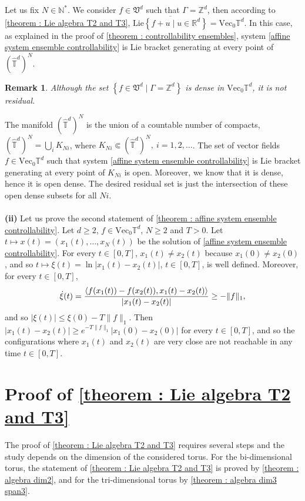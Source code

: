 \documentclass[10pt]{article}
\newcommand{\R}{{\mathbb R}}
\newcommand{\T}{{\mathbb T}}
\newcommand{\N}{{\mathbb N}}
\newcommand{\Z}{{\mathbb Z}}
\newcommand{\ov}{\overline}
\newcommand{\la}{\langle}
\newcommand{\ra}{\rangle}
\newtheorem{rem}{Remark}
\begin{document}
Let us fix $N \in \N^*$. We consider $f\in \mathfrak{V}^d$ such that $\Gamma =\Z^d$, then according to \cref{theorem : Lie algebra T2 and T3}, $\ov{\mathrm{Lie}\left\{f+u \mid u \in \R^d\right\}}=\mathrm{Vec}_0\T^d$. In this case, as explained in the proof of \cref{theorem : controllability ensembles}, system \eqref{affine system ensemble controllability} is Lie bracket generating at every point of $(\hat\T^d)^N$. 
\begin{rem}
    Although the set $\left\{f \in \mathfrak{V}^d \mid \Gamma = \Z^d\right\}$ is dense in $\mathrm{Vec}_0\T^d$, it is not residual.
\end{rem}
The manifold $(\hat\T^d)^N$ is the union of a countable number of compacts, $(\hat\T^d)^N=\bigcup\limits_iK_{Ni}$, where 
$K_{Ni}\Subset(\hat\T^d)^N,\ i=1,2,\dots$. The set of vector fields $f\in\mathrm{Vec}_0\T^d$ such that system \eqref{affine system ensemble controllability} is Lie bracket generating at
every point of $K_{Ni}$ is open. Moreover, we know that it is dense, hence it is open dense. The desired residual set is just the intersection
of these open dense subsets for all $Ni$.
\\ \\
\textbf{(ii)} Let us prove the second statement of \cref{theorem : affine system ensemble controllability}. Let $d\geq 2$, $f\in \mathrm{Vec}_0\T^d$, $N\geq 2$ and $T>0$. Let $t\mapsto x(t)=(x_1(t),\dots,x_N(t))$ be the solution of \eqref{affine system ensemble controllability}. For every $t \in [0,T]$, $x_1(t)\neq x_2(t)$ because $x_1(0)\neq x_2(0)$, and so $t\mapsto \xi(t)=\ln|x_1(t)-x_2(t)|$, $t\in [0,T]$, is well defined. Moreover, for every $t \in [0,T]$,
\begin{equation*}
    \dot{\xi}(t)=\frac{\la f(x_1(t))-f(x_2(t)),x_1(t)-x_2(t)\ra}{|x_1(t)-x_2(t)|} \\
    \geq -\|f\|_1,
\end{equation*}
and so $|\xi(t)|\leq \xi(0)-T\|f\|_1$. Then $|x_1(t)-x_2(t)|\geq e^{-T\|f\|_1}|x_1(0)-x_2(0)|$ for every $t \in [0,T]$, and so the configurations where $x_1(t)$ and $x_2(t)$ are very close are not reachable in any time $t \in [0,T]$.

\section{Proof of \cref{theorem : Lie algebra T2 and T3}} \label{section : Lie algebra computation T2 T3}

The proof of \cref{theorem : Lie algebra T2 and T3} requires several steps and the study depends on the dimension of the considered torus. For the bi-dimensional torus, the statement of \cref{theorem : Lie algebra T2 and T3} is proved by \cref{theorem : algebra dim2}, and for the tri-dimensional torus by \cref{theorem : algebra dim3 span3}. 
\end{document}
